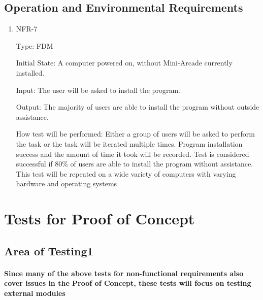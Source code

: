 \documentclass[12pt, titlepage]{article}
\begin{document}
\subsection{Operation and Environmental Requirements}
\begin{enumerate}
\item{NFR-7\\}

Type: FDM
					
Initial State: A computer powered on, without Mini-Arcade currently installed.
					
Input: The user will be asked to install the program.

Output: The majority of users are able to install the program without outside assistance.

How test will be performed: Either a group of users will be asked to perform the task or the task will be iterated multiple times. Program installation success and the amount of time it took will be recorded. Test is considered successful if 80\% of users are able to install the program without assistance. This test will be repeated on a wide variety of computers with varying hardware and operating systems
\end{enumerate}

\section{Tests for Proof of Concept}

\subsection{Area of Testing1}
		
\paragraph{Since many of the above tests for non-functional requirements also cover issues in the Proof of Concept, these tests will focus on testing external modules}
\end{document}
